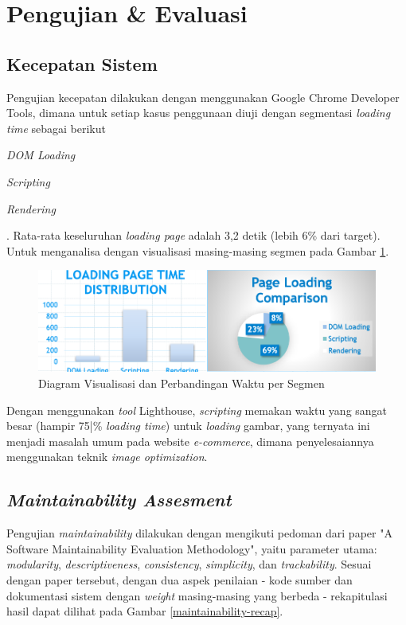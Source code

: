\section{Pengujian \& Evaluasi}

\subsection{Kecepatan Sistem}
Pengujian kecepatan dilakukan dengan menggunakan Google Chrome Developer Tools, dimana untuk setiap kasus penggunaan diuji dengan segmentasi \textit{loading time} sebagai berikut \begin{inlinelist}
	\item \textit{DOM Loading}
	\item \textit{Scripting}
	\item \textit{Rendering}
\end{inlinelist}. Rata-rata keseluruhan \textit{loading page} adalah 3,2 detik (lebih 6\% dari target). Untuk menganalisa dengan visualisasi masing-masing segmen pada Gambar \ref{bar-chart-speed}.
\begin{figure}[b]
	\centering
	\includegraphics[width=.4\textwidth]{images/bab5/speed/combined.png}
	\caption{Diagram Visualisasi dan Perbandingan Waktu per Segmen}
	\label{bar-chart-speed}
\end{figure}
	Dengan menggunakan \textit{tool} Lighthouse, \textit{scripting} memakan waktu yang sangat besar (hampir 75|\% \textit{loading time}) untuk \textit{loading} gambar, yang ternyata ini menjadi masalah umum pada website \textit{e-commerce}, dimana penyelesaiannya menggunakan teknik \textit{image optimization}.

\subsection{\textit{Maintainability Assesment}}
Pengujian \textit{maintainability} dilakukan dengan mengikuti pedoman dari paper "A Software Maintainability Evaluation Methodology"\cite{peercy_software_nodate}, yaitu parameter utama: \textit{modularity}, \textit{descriptiveness}, \textit{consistency}, \textit{simplicity}, dan \textit{trackability}. Sesuai dengan paper tersebut, dengan dua aspek penilaian - kode sumber dan dokumentasi sistem dengan \textit{weight} masing-masing yang berbeda - rekapitulasi hasil dapat dilihat pada Gambar \ref{maintainability-recap}.

